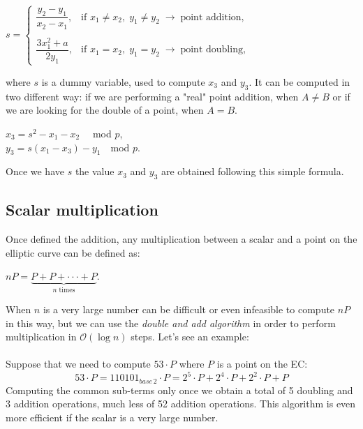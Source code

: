 \begin{center} 
	$s=\begin{cases} \dfrac{y_2-y_1}{x_2-x_1}, & \mbox{if } x_1\neq x_2, \; y_1\neq y_2 \;\rightarrow \; \text{point addition},\\ \\ \dfrac{3x_1^2+a}{2y_1}, & \mbox{if } x_1= x_2, \; y_1= y_2 \;\rightarrow \; \text{point doubling}, \end{cases}$
\end{center}
where $s$ is a dummy variable, used to compute $x_3$ and $y_3$. It can be computed in two different way: if we are performing a "real" point addition, when $A\neq B$ or if we are looking for the double of a point, when $A= B$.
\begin{center} 
	$ x_3=s^2-x_1-x_2  \quad$ mod $p$,\\
	$y_3=s(x_1-x_3)-y_1  \quad$mod $p$.
\end{center}
Once we have $s$ the value $x_3$ and $y_3$ are obtained following this simple formula.


\subsection{Scalar multiplication}
Once defined the addition, any multiplication between a scalar and a point on the elliptic curve can be defined as:
\begin{center} 
	$ nP=\underbrace{
		P+P+\cdot \cdot \cdot+P
	}_{n\text{ times}}$.
\end{center}
When $n$ is a very large number can be difficult or even infeasible to compute $nP$ in this way, but we can use the \textit{double and add algorithm} in order to perform multiplication in $\mathcal{O}(\log{}n)$ steps. Let's see an example:
\\ \\
Suppose that we need to compute $53 \cdot P$ where $P$ is a point on the EC:
\begin{equation*}
53 \cdot P = 110101_{base\, 2} \cdot P = 2^{5}\cdot P + 2^{4}\cdot P + 2^{2}\cdot P + P
\end{equation*}
Computing the common sub-terms only once we obtain a total of 5 doubling and 3 addition operations, much less of 52 addition operations. This algorithm is even more efficient if the scalar is a very large number.

